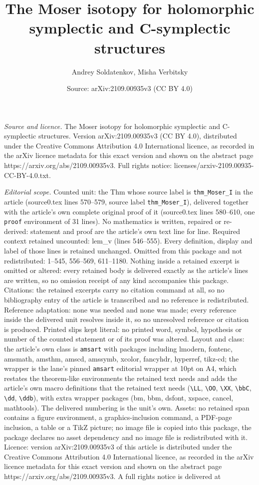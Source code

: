 \documentclass[10pt,a4paper]{amsart}
\title[The Moser isotopy for holomorphic symplectic and C-symplecti]{The Moser isotopy for holomorphic symplectic and C-symplectic structures}
\author{Andrey Soldatenkov, Misha Verbitsky}
\date{Source: arXiv:2109.00935v3 (CC BY 4.0)}
\begin{document}
\maketitle

\noindent\emph{Source and licence.} The Moser isotopy for holomorphic symplectic and C-symplectic structures. Version arXiv:2109.00935v3 (CC BY 4.0), distributed under the Creative Commons Attribution 4.0 International licence, as recorded in the arXiv licence metadata for this exact version and shown on the abstract page https://arxiv.org/abs/2109.00935v3. Full rights notice: licenses/arxiv-2109.00935-CC-BY-4.0.txt.\par\smallskip

\noindent\textit{Editorial scope.} Counted unit: the Thm whose source label is \texttt{thm\_Moser\_I} in the article (source0.tex lines 570--579, source label \texttt{thm\_Moser\_I}), delivered together with the article's own complete original proof of it (source0.tex lines 580--610, one \texttt{proof} environment of 31 lines). No mathematics is written, repaired or re-derived: statement and proof are the article's own text line for line. Required context retained uncounted: lem\_v (lines 546--555). Every definition, display and label of those lines is retained unchanged. Omitted from this package and not redistributed: 1--545, 556--569, 611--1180. Nothing inside a retained excerpt is omitted or altered: every retained body is delivered exactly as the article's lines are written, so no omission receipt of any kind accompanies this package. Citations: the retained excerpts carry no citation command at all, so no bibliography entry of the article is transcribed and no reference is redistributed. Reference adaptation: none was needed and none was made; every reference inside the delivered unit resolves inside it, so no unresolved reference or citation is produced. Printed slips kept literal: no printed word, symbol, hypothesis or number of the counted statement or of its proof was altered. Layout and class: the article's own class is \texttt{amsart} with packages including lmodern, fontenc, amsmath, amsthm, amscd, amssymb, xcolor, fancyhdr, hyperref, tikz-cd; the wrapper is the lane's pinned \texttt{amsart} editorial wrapper at 10pt on A4, which restates the theorem-like environments the retained text needs and adds the article's own macro definitions that the retained text needs (\texttt{\textbackslash LL}, \texttt{\textbackslash OO}, \texttt{\textbackslash XX}, \texttt{\textbackslash bbC}, \texttt{\textbackslash dd}, \texttt{\textbackslash ddb}), with extra wrapper packages (bm, bbm, dsfont, xspace, cancel, mathtools). The delivered numbering is the unit's own. Assets: no retained span contains a figure environment, a graphics-inclusion command, a PDF-page inclusion, a table or a TikZ picture; no image file is copied into this package, the package declares no asset dependency and no image file is redistributed with it. Licence: version arXiv:2109.00935v3 of this article is distributed under the Creative Commons Attribution 4.0 International licence, as recorded in the arXiv licence metadata for this exact version and shown on the abstract page https://arxiv.org/abs/2109.00935v3. A full rights notice is delivered at 
\end{document}
